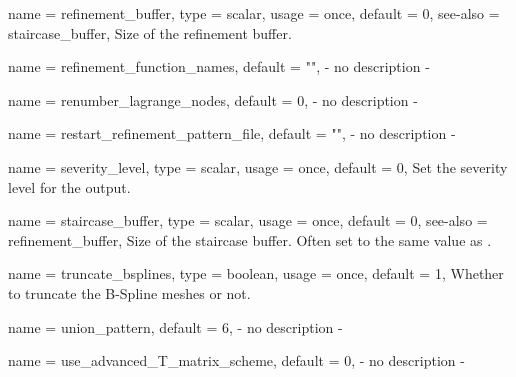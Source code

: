 \begin{parameter}{
    name    = {refinement_buffer},
    type    = {scalar},
    usage   = {once},
    default = {0},
    see-also = {staircase_buffer},
}
Size of the refinement buffer.
\end{parameter}

\begin{parameter}{
    name    = {refinement_function_names},
    default = {""},
}
- no description -
\end{parameter}

\begin{parameter}{
    name    = {renumber_lagrange_nodes},
    default = {0},
}
- no description -
\end{parameter}

\begin{parameter}{
    name    = {restart_refinement_pattern_file},
    default = {""},
}
- no description -
\end{parameter}

\begin{parameter}{
    name    = {severity_level},
    type    = {scalar},
    usage   = {once},
    default = {0},
}
Set the severity level for the \moris output.
\end{parameter}

\begin{parameter}{
    name    = {staircase_buffer},
    type    = {scalar},
    usage   = {once},
    default = {0},
    see-also = {refinement_buffer},
}
Size of the staircase buffer. 
Often set to the same value as .
\end{parameter}

\begin{parameter}{
    name    = {truncate_bsplines},
    type    = {boolean},
    usage   = {once},
    default = {1},
}
Whether to truncate the B-Spline meshes or not.
\end{parameter}

\begin{parameter}{
    name    = {union_pattern},
    default = {6},
}
- no description -
\end{parameter}

\begin{parameter}{
    name    = {use_advanced_T_matrix_scheme},
    default = {0},
}
- no description -
\end{parameter}

